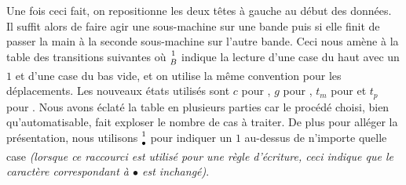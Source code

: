 \begin{multicols}{2}


\phantom{\emptybox\emptybox}%
	\deah

\emptybox\emptybox%
\emptybox\emptybox

\emptybox\emptybox%
	\emptybox\emptybox\emptybox%
\emptybox\emptybox

\phantom{\emptybox\emptybox}%
	\head


\medskip %

\phantom{\emptybox\emptybox\emptybox}%
	\deah

\emptybox\emptybox%
\emptybox\emptybox

\emptybox\emptybox%
	\emptybox\emptybox%
\emptybox\emptybox

\phantom{\emptybox\emptybox\emptybox}%
	\head


\medskip %

\phantom{\emptybox\emptybox\emptybox\emptybox}%
	\deah

\emptybox\emptybox%
\emptybox\emptybox

\emptybox\emptybox%
	\emptybox%
\emptybox\emptybox

\phantom{\emptybox\emptybox\emptybox\emptybox}%
	\head


\medskip %

\phantom{\emptybox\emptybox\emptybox\emptybox\emptybox}%
	\deah

\emptybox\emptybox%
\emptybox\emptybox

\emptybox\emptybox%
\emptybox\emptybox

\phantom{\emptybox\emptybox\emptybox\emptybox\emptybox}%
	\head

\end{multicols}


Une fois ceci fait, on repositionne les deux têtes à gauche au début des données.
Il suffit alors de faire agir une sous-machine sur une bande puis si elle finit de passer la main à la seconde sous-machine sur l'autre bande.
Ceci nous amène à la table des transitions suivantes où ${\scriptsize\begin{matrix}1\\B\end{matrix}}$ indique la lecture d'une case du haut avec un $1$ et d'une case du bas vide, et on utilise la même convention pour les déplacements.
Les nouveaux états utilisés sont
$c$ pour , 
$g$ pour ,
$t_m$ pour  et
$t_p$ pour .
Nous avons éclaté la table en plusieurs parties car le procédé choisi, bien qu'automatisable, fait exploser le nombre de cas à traiter.
De plus pour alléger la présentation, nous utilisons ${\scriptsize\begin{matrix}1\\\bullet\end{matrix}}$ pour indiquer un $1$ au-dessus de n'importe quelle case
\emph{(lorsque ce raccourci est utilisé pour une règle d'écriture, ceci indique que le caractère correspondant à $\bullet$ est inchangé)}.

